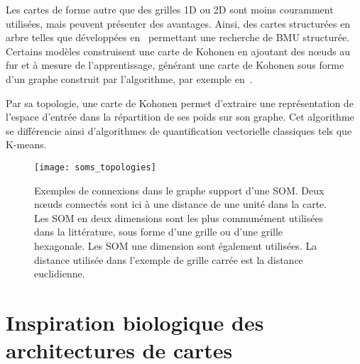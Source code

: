 \documentclass[../main]{subfiles}
\begin{document}
Les cartes de forme autre que des grilles 1D ou 2D sont moins couramment utilisées, mais peuvent présenter des avantages. Ainsi, des cartes structurées en arbre telles que développées en~\cite{koikkalainen_self-organizing_1990} permettant une recherche de BMU structurée. Certains modèles construisent une carte de Kohonen en ajoutant des n\oe{}uds au fur et à mesure de l'apprentissage, générant une carte de Kohonen sous forme d'un graphe construit par l'algorithme, par exemple en~\cite{alahakoon_dynamic_2000, yamaguchi_adaptive_2010}.

Par sa topologie, une carte de Kohonen permet d'extraire une représentation de l'espace d'entrée dans la répartition de ses poids sur son graphe. Cet algorithme se différencie ainsi d'algorithmes de quantification vectorielle classiques tels que K-means.

\begin{figure}
\centering
\texttt{[image: soms\_topologies]}
\caption{Exemples de connexions dans le graphe support d'une SOM. Deux n\oe{}uds connectés sont ici à une distance de une unité dans la carte.
Les SOM en deux dimensions sont les plus communément utilisées dans la littérature, sous forme d'une grille ou d'une grille hexagonale. Les SOM une dimension sont également utilisées. La distance utilisée dans l'exemple de grille carrée est la distance euclidienne.
\label{fig:topo}}
\end{figure}




\section{Inspiration biologique des architectures de cartes}
\end{document}
